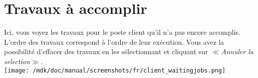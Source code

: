 \section{Travaux \`a accomplir}Ici, vous voyez les travaux pour le poste client qu'il n'a pas encore accomplis. L'ordre des travaux correspond \`a l'ordre de leur ex\'ecution. Vous avez la possibilit\'e d'effacer des travaux en les s\'electionnant et cliquant sur \textit{$\ll$Annuler la selection$\gg$}.\\
\texttt{[image: /mdk/doc/manual/screenshots/fr/client\_waitingjobs.png]} \\
